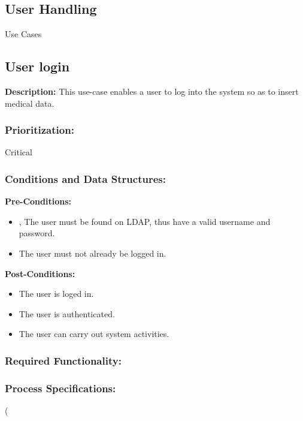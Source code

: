 
\newpage
\setlength{\voffset}{-3cm}

\begin{center}
\section{\textbf{\huge{User Handling}}}

\Large{Use Cases}
\end{center}


\subsection{User login}
\textbf{Description:}
This use-case enables a user to log into the system so as to insert medical data.
\subsubsection{Prioritization:}
Critical
\subsubsection{Conditions and Data Structures:}
\textbf{Pre-Conditions:}
\begin{itemize}
	\item , The user must be found on LDAP, thus have a valid username and password.
	\item The user must not already be logged in.
\end{itemize}

\textbf{Post-Conditions:}	
\begin{itemize}
	\item The user is loged in.
	\item The user is authenticated.
	\item The user can carry out system activities.
\end{itemize}
\subsubsection{Required Functionality:} 
\subsubsection{Process Specifications:} 

\left( 

